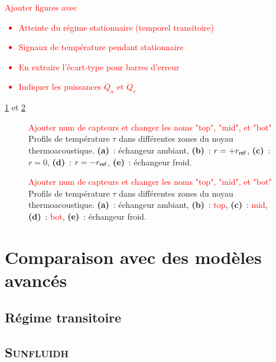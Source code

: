 \textcolor{red}{Ajouter figures avec \begin{itemize}
    \item Atteinte du régime stationnaire (temporel transitoire)
    \item Signaux de température pendant stationnaire
    \item En extraire l'écart-type pour barres d'erreur
    \item Indiquer les puissances $\dot Q_a$ et $\dot Q_c$
\end{itemize}}

\ref{fig:FrigoToupie_Profils_H12_WaterAcou} et \ref{fig:FrigoToupie_Profils_V12_WaterAcou}

\begin{figure}[ht!]
    \centering
    
    \caption{\textcolor{red}{Ajouter num de capteurs et changer les noms "top", "mid", et "bot"} Profils de température $\tau$ dans différentes zones du noyau thermoacoustique. {\bf (a)}~: échangeur ambiant, {\bf (b)}~: $r=+r_{\sf ref}$, {\bf (c)}~: $r=0$, {\bf (d)}~: $r=-r_{\sf ref}$, {\bf (e)}~: échangeur froid.}%
    \label{fig:FrigoToupie_Profils_H12_WaterAcou}
\end{figure}

\begin{figure}[ht!]
    \centering
    
    \caption{\textcolor{red}{Ajouter num de capteurs et changer les noms "top", "mid", et "bot"} Profils de température $\tau$ dans différentes zones du noyau thermoacoustique. {\bf (a)}~: échangeur ambiant, {\bf (b)}~: \textcolor{red}{top}, {\bf (c)}~: \textcolor{red}{mid}, {\bf (d)}~: \textcolor{red}{bot}, {\bf (e)}~: échangeur froid.}%
    \label{fig:FrigoToupie_Profils_V12_WaterAcou}
\end{figure}

\section{Comparaison avec des modèles avancés}

\subsection{Régime transitoire}

\cite{lotton_transient_2009}

\subsection{\textsc{Sunfluidh}}

\cite{fraigneau_numerical_2023}